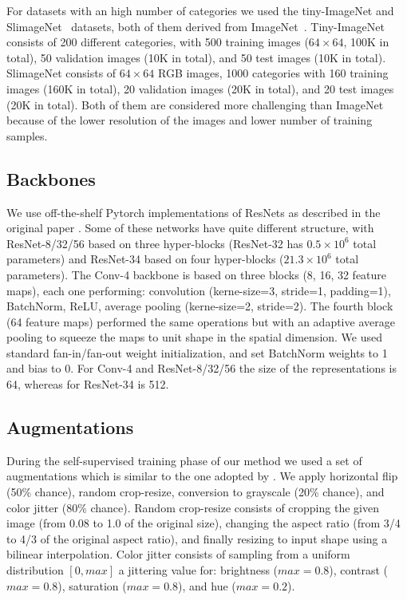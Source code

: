 \documentclass{article}
\begin{document}
For datasets with an high number of categories we used the tiny-ImageNet and SlimageNet~\citep{antoniou2020defining} datasets, both of them derived from ImageNet~\citep{russakovsky2015imagenet}. Tiny-ImageNet consists of 200 different categories, with 500 training images ($64 \times 64$, 100K in total), 50 validation images (10K in total), and 50 test images (10K in total). SlimageNet consists of $64 \times 64$ RGB images, 1000 categories with 160 training images (160K in total), 20 validation images (20K in total), and 20 test images (20K in total). Both of them are considered more challenging than ImageNet because of the lower resolution of the images and lower number of training samples.

\subsection{Backbones}

We use off-the-shelf Pytorch implementations of ResNets as described in the original paper \citep{he2016deep}. Some of these networks have quite different structure, with ResNet-8/32/56 based on three hyper-blocks (ResNet-32 has $0.5 \times 10^{6}$ total parameters) and ResNet-34 based on four hyper-blocks ($21.3 \times 10^{6}$ total parameters).
The Conv-4 backbone is based on three blocks (8, 16, 32 feature maps), each one performing: convolution (kerne-size=3, stride=1, padding=1), BatchNorm, ReLU, average pooling (kerne-size=2, stride=2). The fourth block (64 feature maps) performed the same operations but with an adaptive average pooling to squeeze the maps to unit shape in the spatial dimension.
We used standard fan-in/fan-out weight initialization, and set BatchNorm weights to 1 and bias to 0. For Conv-4 and ResNet-8/32/56 the size of the representations is 64, whereas for ResNet-34 is 512.

\subsection{Augmentations}\label{appendix:augmentations}

During the self-supervised training phase of our method we used a set of augmentations which is similar to the one adopted by \cite{chen2020simple}. We apply horizontal flip (50\% chance), random crop-resize, conversion to grayscale (20\% chance), and color jitter (80\% chance). Random crop-resize consists of cropping the given image (from 0.08 to 1.0 of the original size), changing the aspect ratio (from 3/4 to 4/3 of the original aspect ratio), and finally resizing to input shape using a bilinear interpolation. Color jitter consists of sampling from a uniform distribution $[0, max]$ a jittering value for: brightness ($max=0.8$), contrast ($max=0.8$), saturation ($max=0.8$), and hue ($max=0.2$).
\end{document}
